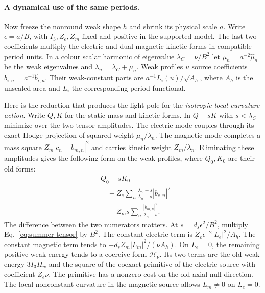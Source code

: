 \documentclass[10pt]{article}
\theoremstyle{definition}
\begin{document}
\paragraph{A dynamical use of the same periods.}
Now freeze the nonround weak shape \(h\) and shrink its physical scale \(a\). Write \(\epsilon=a/B\), with \(I_3,Z_e,Z_m\) fixed and positive in the supported model. The last two coefficients multiply the electric and dual magnetic kinetic forms in compatible period units. In a colour scalar harmonic of eigenvalue \(\lambda_C=\nu/B^2\) let \(\mu_n=a^{-2}\widehat\mu_n\) be the weak eigenvalues and \(\lambda_n=\lambda_C+\mu_n\). Weak profiles \(u\) source coefficients \(b_{i,n}=a^{-1}\widehat b_{i,n}\). Their weak-constant parts are \(a^{-1}L_i(u)/\sqrt{A_h}\), where \(A_h\) is the unscaled area and \(L_i\) the corresponding period functional.

Here is the reduction that produces the light pole for the \emph{isotropic local-curvature action}. Write \(Q,K\) for the static mass and kinetic forms. In \(Q-sK\) with \(s<\lambda_C\) minimize over the two tensor amplitudes. The electric mode couples through its exact Hodge projection of squared weight \(\mu_n/\lambda_n\). The magnetic mode completes a mass square \(Z_m|c_n-b_{m,n}|^2\) and carries kinetic weight \(Z_m/\lambda_n\). Eliminating these amplitudes gives the following form on the weak profiles, where \(Q_0,K_0\) are their old forms:
\begin{equation}
 \begin{aligned}
 &Q_0-sK_0\\[-2pt]
 &\quad+Z_e\sum_n \frac{\lambda_C-s}{\lambda_n-s}|b_{e,n}|^2\\
 &\quad-Z_m s\sum_n\frac{|b_{m,n}|^2}{\lambda_n-s}.
 \end{aligned}
 \label{eq:summer-tensor}
\end{equation}
The difference between the two numerators matters. At \(s=d_s\epsilon^2/B^2\), multiply Eq.~\eqref{eq:summer-tensor} by \(B^2\). The constant electric term is \(Z_e\epsilon^{-2}|L_e|^2/A_h\). The constant magnetic term tends to \(-d_sZ_m|L_m|^2/(\nu A_h)\). On \(L_e=0\), the remaining positive weak energy tends to a coercive form \(\mathcal H_\nu\). Its two terms are the old weak energy \(3I_3H_w\) and the square of the coexact primitive of the electric source with coefficient \(Z_e\nu\). The primitive has a nonzero cost on the old axial null direction. The local nonconstant curvature in the magnetic source allows \(L_m\ne0\) on \(L_e=0\).
\end{document}
